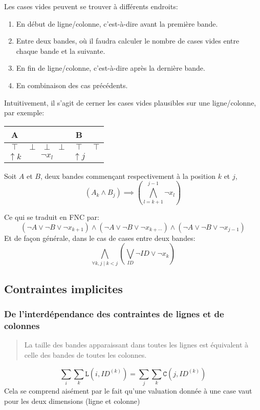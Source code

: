 \documentclass[a4paper,12pt]{report}
\newcommand\black{\cellcolor{black}}
\begin{document}
Les cases vides peuvent se trouver à différents endroits:
\begin{enumerate}
\item En début de ligne/colonne, c'est-à-dire avant la première bande.
\item Entre deux bandes, où il faudra calculer le nombre de cases vides entre chaque bande et la suivante.
\item En fin de ligne/colonne, c'est-à-dire après la dernière bande.
\item En combinaison des cas précédents.\\
\end{enumerate}
Intuitivement, il s'agit de cerner les cases vides plausibles sur une ligne/colonne, par exemple:		
			\begin{center}						
			\begin{tabular}{|c|c|c|c|c|c|}
			\hline 
			\black \color{white}A  &   &    &   & \black \color{white} B & \black   \\ 			
			\hline 
			$\top$ & $\bot$ & $\bot$  & $\bot$ & $\top$ & $\top$ \\ 
			\hline  
			$\uparrow k$ & \multicolumn{3}{c|}{$\lnot x_l$} & $\uparrow j$ & \\ 
			\hline
			\end{tabular}
			\end{center}
Soit $A$ et $B$, deux bandes commençant respectivement à la position $k$ et $j$,
$$( A_k \wedge B_j ) \implies (\bigwedge_{l=k+1}^{j-1} \lnot x_l)$$

Ce qui se traduit en FNC par:
$$(\lnot A\vee \lnot B \vee \lnot x_{k+1})\wedge(\lnot A \vee \lnot B \vee \lnot x_{k+\cdots})\wedge(\lnot A\vee \lnot B\vee \lnot x_{j-1})$$
Et de façon générale, dans le cas de cases entre deux bandes:
$$ \bigwedge_{\forall k,j\; | \;k<j} \left( \bigvee_{ID} \lnot ID \vee \lnot x_k \right) $$


\subsection{Contraintes implicites}
\subsubsection{De l'interdépendance des contraintes de lignes et de colonnes}
\begin{quote}
 La taille des bandes apparaissant dans toutes les lignes est équivalent à celle des bandes de toutes les colonnes.	\\	
\end{quote}
$$\sum_i \sum_k \mathtt{L}(i,ID^{(k)}) = \sum_j \sum_k \mathtt{C}(j,ID^{(k)})$$
Cela se comprend aisément par le fait qu'une valuation donnée à une case vaut pour les deux dimensions (ligne et colonne)
\end{document}
